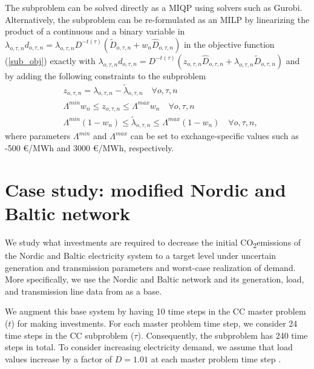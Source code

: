 \documentclass[final]{IEEEtran}
\newcommand{\COtwo}{CO\textsubscript{2}\;}
\begin{document}
The subproblem can be solved directly as a MIQP using solvers such as Gurobi. Alternatively, the subproblem can be re-formulated as an MILP by linearizing the product of a continuous and a binary variable in $\lambda_{o, \tau, n} d_{o, \tau, n} = \lambda_{o, \tau, n} D^{-t(\tau)} (\tilde{D}_{o, \tau, n} + w_n \hat{D}_{o, \tau, n})$ in the objective function (\ref{sub_obj}) exactly with $\lambda_{o, \tau, n} d_{o, \tau, n} = D^{-t(\tau)} (z_{o, \tau, n} \hat{D}_{o, \tau, n} + \lambda_{o, \tau, n} \tilde{D}_{o, \tau, n})$ and by adding the following constraints to the subproblem
\begin{align}
&\label{z_constr} z_{o, \tau, n} = \lambda_{o, \tau, n} - \tilde{\lambda}_{o, \tau, n} \quad \forall o, \tau, n \\
&\Lambda^{min} w_n \leq z_{o, \tau, n} \leq \Lambda^{max} w_n \quad \forall o, \tau, n \\
&\Lambda^{min} (1 - w_n) \leq \tilde{\lambda}_{o, \tau, n} \leq \Lambda^{max} (1 - w_n) \quad \forall o, \tau, n,
\end{align}
where parameters $\Lambda^{min}$ and $\Lambda^{max}$ can be set to exchange-specific values such as -500 €/MWh and 3000 €/MWh, respectively.

\section{Case study: modified Nordic and Baltic network}
\label{section_case_study}

We study what investments are required to decrease the initial \COtwo emissions of the Nordic and Baltic electricity system to a target level under uncertain generation and transmission parameters and worst-case realization of demand. More specifically, we use the Nordic and Baltic network and its generation, load, and transmission line data from \cite{Virasjoki} as a base.

We augment this base system by having 10 time steps in the CC master problem ($t$) for making investments. For each master problem time step, we consider 24 time steps in the CC subproblem ($\tau$). Consequently, the subproblem has 240 time steps in total. To consider increasing electricity demand, we assume that load values increase by a factor of $D = 1.01$ at each master problem time step \cite{EEA_consumption}.
\end{document}
